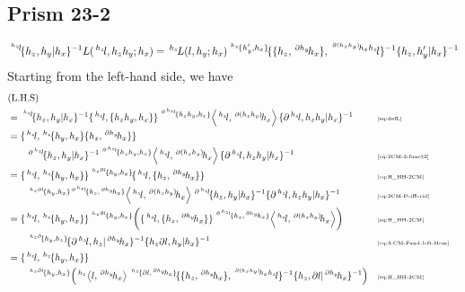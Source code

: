 \documentclass[11pt, reqno]{amsart} %
\newcommand{\act}[1]{\,\sp{#1}\!}
\theoremstyle{definition}
\theoremstyle{remark}
\numberwithin{equation}{section}
\begin{document}
\subsection{Prism 23-2}
\[
  \act{\act{h_z}l}\{h_z,h_y|h_x\}^{-1}L(\act{h_z}l,h_zh_y;h_x) = \act{h_z}L(l,h_y;h_x)\act{\act{h_z}\{h_y',h_x\}}\{\{h_z,\act{\partial h_y}h_x\},\act{\act{\partial (h_zh_y)}h_xh_z}l\}^{-1}\{h_z,h_y'|h_x\}^{-1}
\]
Starting from the left-hand side, we have
\begin{align*}
  &(\text{L.H.S}) \\
  &= 
  \act{\act{h_z}l}\{h_z,h_y|h_x\}^{-1}\{\act{h_z}l,\{h_zh_y,h_x\}\}\act{\act{\partial \act{h_z}l}\{h_zh_y,h_x\}}\left<\act{h_z}l,\act{\partial (h_zh_y)}h_x\right>\{\partial \act{h_z}l,h_zh_y|h_x\}^{-1} & &\text{\tiny \eqref{eq:defL}} \\
  &= \{\act{h_z}l,\act{h_z}\{h_y,h_x\}\{h_z,\act{\partial h_y}h_x\}\} \\
  &\qquad \act{\partial\act{h_z}l}\{h_z,h_y|h_x\}^{-1}\act{\act{\partial \act{h_z}l}\{h_zh_y,h_x\}}\left<\act{h_z}l,\act{\partial (h_zh_y)}h_x\right>\{\partial \act{h_z}l,h_zh_y|h_x\}^{-1} & &\text{\tiny \eqref{eq:2CM-2-funct2}} \\
  &= \{\act{h_z}l,\act{h_z}\{h_y,h_x\}\}\act{\act{h_z\partial l}\{h_y,h_x\}}\{\act{h_z}l,\{h_z,\act{\partial h_y}h_x\}\} & &\text{\tiny \eqref{eq:H_HH-2CM}} \\
  &\qquad \act{\act{h_z\partial l}\{h_y,h_x\}\act{\partial\act{h_z}l}\{h_z,\act{\partial h_y}h_x\}}\left<\act{h_z}l,\act{\partial (h_zh_y)}h_x\right>\act{\partial\act{h_z}l}\{h_z,h_y|h_x\}^{-1}\{\partial \act{h_z}l,h_zh_y|h_x\}^{-1} & &\text{\tiny \eqref{eq:2CM-Peifferid}} \\
  &= \{\act{h_z}l,\act{h_z}\{h_y,h_x\}\}\act{\act{h_z\partial l}\{h_y,h_x\}}\left(\{\act{h_z}l,\{h_z,\act{\partial h_y}h_x\}\}\act{\act{\partial\act{h_z}l}\{h_z,\act{\partial h_y}h_x\}}\left<\act{h_z}l,\act{\partial (h_zh_y)}h_x\right>\right) & &\text{\tiny \eqref{eq:H_HH-2CM}} \\
  &\qquad 
  \act{\act{h_z\partial}\{h_y,h_z\}}\{\partial \act{h_z}l,h_z|\act{\partial h_y}h_x\}^{-1}\{h_z\partial l,h_y|h_x\}^{-1} & &\text{\tiny \eqref{eq:3-CM-Fund-left-Hom}} \\
  &= \{\act{h_z}l,\act{h_z}\{h_y,h_x\}\} \\
  &\qquad \act{\act{h_z\partial l}\{h_y,h_x\}}\left(\act{h_z}\left<l,\act{\partial h_y}h_x\right>\act{\act{h_z}\{\partial l,\act{\partial h_y}h_x\}}\{\{h_z,\act{\partial h_y}h_x\},\act{\act{\partial (h_zh_y)}h_xh_z}l\}^{-1}\{h_z,\partial l|\act{\partial h_y}h_x\}^{-1}\right) & &\text{\tiny \eqref{eq:H_HH-2CM}} \\

\end{align*}
\end{document}
